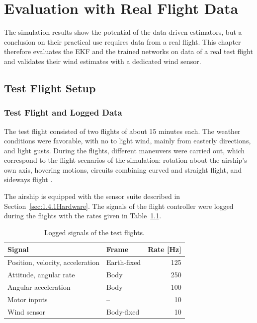 \chapter{Evaluation with Real Flight Data}
\label{chap:6.0FlightTest}

The simulation results show the potential of the data-driven estimators, but a conclusion on their practical use requires data from a real flight. This chapter therefore evaluates the EKF and the trained networks on data of a real test flight and validates their wind estimates with a dedicated wind sensor.


\section{Test Flight Setup}
\label{sec:6.1FlightSetup}

\subsection{Test Flight and Logged Data}
\label{sec:6.1.1FlightData}

The test flight consisted of two flights of about 15 minutes each. The weather conditions were favorable, with no to light wind, mainly from easterly directions, and light gusts. During the flights, different maneuvers were carried out, which correspond to the flight scenarios of the simulation: rotation about the airship's own axis, hovering motions, circuits combining curved and straight flight, and sideways flight .

The airship is equipped with the sensor suite described in Section~\ref{sec:1.4.1Hardware}. The signals of the flight controller were logged during the flights with the rates given in Table~\ref{tab:flight_signals}.

\begin{table}[htb]
	\centering
	\caption{Logged signals of the test flights.}
	\label{tab:flight_signals}
	\begin{tabular}{llr}
		\toprule
		Signal & Frame & Rate [Hz] \\
		\midrule
		Position, velocity, acceleration & Earth-fixed & 125 \\
		Attitude, angular rate           & Body & 250 \\
		Angular acceleration             & Body& 100 \\
		Motor inputs                     & --           & 10 \\
		Wind sensor                      & Body-fixed   & 10 \\
		\bottomrule
	\end{tabular}
\end{table}

